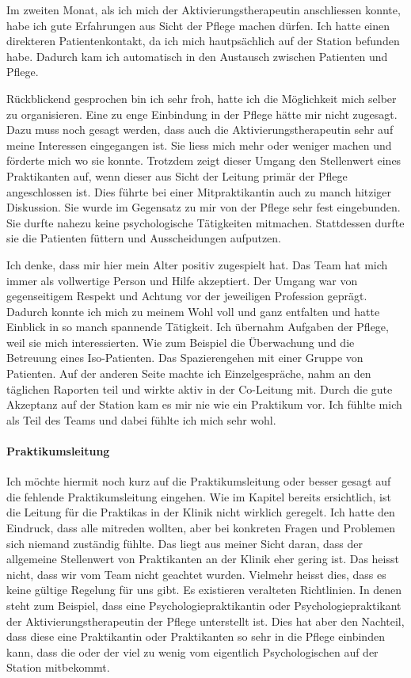 Im zweiten Monat, als ich mich der Aktivierungstherapeutin anschliessen konnte, habe ich gute Erfahrungen aus Sicht der Pflege machen dürfen. Ich hatte einen direkteren Patientenkontakt, da ich mich hautpsächlich auf der Station befunden habe. Dadurch kam ich automatisch in den Austausch zwischen Patienten und Pflege. 

Rückblickend gesprochen bin ich sehr froh, hatte ich die Möglichkeit mich selber zu organisieren. Eine zu enge Einbindung in der Pflege hätte mir nicht zugesagt. Dazu muss noch gesagt werden, dass auch die Aktivierungstherapeutin sehr auf meine Interessen eingegangen ist. Sie liess mich mehr oder weniger machen und förderte mich wo sie konnte. Trotzdem zeigt dieser Umgang den Stellenwert eines Praktikanten auf, wenn dieser aus Sicht der Leitung primär der Pflege angeschlossen ist. Dies führte bei einer Mitpraktikantin auch zu manch hitziger Diskussion. Sie wurde im Gegensatz zu mir von der Pflege sehr fest eingebunden. Sie durfte nahezu keine psychologische Tätigkeiten mitmachen. Stattdessen durfte sie die Patienten füttern und Ausscheidungen aufputzen. 

Ich denke, dass mir hier mein Alter positiv zugespielt hat. Das Team hat mich immer als vollwertige Person und Hilfe akzeptiert. Der Umgang war von gegenseitigem Respekt und Achtung vor der jeweiligen Profession geprägt. Dadurch konnte ich mich zu meinem Wohl voll und ganz entfalten und hatte Einblick in so manch spannende Tätigkeit. Ich übernahm Aufgaben der Pflege, weil sie mich interessierten. Wie zum Beispiel die Überwachung und die Betreuung eines Iso-Patienten. Das Spazierengehen mit einer Gruppe von Patienten. Auf der anderen Seite machte ich Einzelgespräche, nahm an den täglichen Raporten teil und wirkte aktiv in der Co-Leitung mit. Durch die gute Akzeptanz auf der Station kam es mir nie wie ein Praktikum vor. Ich fühlte mich als Teil des Teams und dabei fühlte ich mich sehr wohl.  

\paragraph{Praktikumsleitung}
Ich möchte hiermit noch kurz auf die Praktikumsleitung oder besser gesagt auf die fehlende Praktikumsleitung eingehen. Wie im Kapitel  bereits ersichtlich, ist die Leitung für die Praktikas in der Klinik nicht wirklich geregelt. Ich hatte den Eindruck, dass alle mitreden wollten, aber bei konkreten Fragen und Problemen sich niemand zuständig fühlte. Das liegt aus meiner Sicht daran, dass der allgemeine Stellenwert von Praktikanten an der Klinik eher gering ist. Das heisst nicht, dass wir vom Team nicht geachtet wurden. Vielmehr heisst dies, dass es keine gültige Regelung für uns gibt. Es existieren veralteten Richtlinien. In denen steht zum Beispiel, dass eine Psychologiepraktikantin oder Psychologiepraktikant der Aktivierungstherapeutin der Pflege unterstellt ist. Dies hat aber den Nachteil, dass diese eine Praktikantin oder Praktikanten so sehr in die Pflege einbinden kann, dass die oder der viel zu wenig vom eigentlich Psychologischen auf der Station mitbekommt. 


